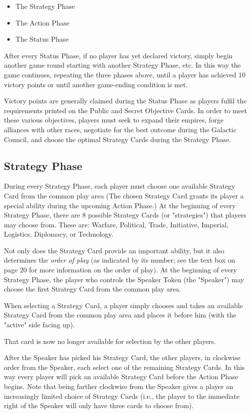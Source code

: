 \documentclass[11pt,fleqn]{book} %
\begin{document}
\begin{itemize}
    \item The Strategy Phase
    \item The Action Phase
    \item The Status Phase
\end{itemize}

After every Status Phase, if no player has yet declared victory, simply begin another game round starting with another Strategy Phase, etc. In this way the game continues, repeating the three phases above, until a player has achieved 10 victory points or until another game-ending condition is met.

Victory points are generally claimed during the Status Phase as players fulfil the requirements printed on the Public and Secret Objective Cards. In order to meet these various objectives, players must seek to expand their empires, forge alliances with other races, negotiate for the best outcome during the Galactic Council, and choose the optimal Strategy Cards during the Strategy Phase.


\subsection{ Strategy Phase}
During every Strategy Phase, each player must choose one available Strategy Card from the common play area (The chosen Strategy Card grants its player a special ability during the upcoming Action Phase.) At the beginning of every Strategy Phase, there are 8 possible Strategy Cards (or "strategies") that players may choose from. These are: Warfare, Political, Trade, Initiative, Imperial, Logistics, Diplomacy, or Technology.

Not only does the Strategy Card provide an important ability, but it also determines the \emph{order of play} (as indicated by its number; see the text box on page 20 for more information on the order of play).
At the beginning of every Strategy Phase, the player who controls the Speaker Token (the "Speaker") may choose the first Strategy Card from the common play area.

When selecting a Strategy Card, a player simply chooses and takes an available Strategy Card from the common play area and places it before him (with the "active" side facing up).

That card is now no longer available for selection by the other players.

After the Speaker has picked his Strategy Card, the other players, in clockwise order from the Speaker, each select one of the remaining Strategy Cards. In this way every player will pick an available Strategy Card before the Action Phase begins. Note that being farther clockwise from the Speaker gives a player an increasingly limited choice of Strategy Cards (i.e., the player to the immediate right of the Speaker will only have three cards to choose from).
\end{document}
